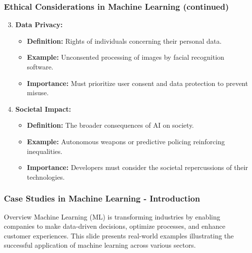 \documentclass[aspectratio=169]{beamer}
\begin{document}
\begin{frame}[fragile]
    \frametitle{Ethical Considerations in Machine Learning (continued)}
    \begin{enumerate}
        \setcounter{enumi}{2} %
        \item \textbf{Data Privacy:}
        \begin{itemize}
            \item \textbf{Definition:} Rights of individuals concerning their personal data.
            \item \textbf{Example:} Unconsented processing of images by facial recognition software.
            \item \textbf{Importance:} Must prioritize user consent and data protection to prevent misuse.
        \end{itemize}
        
        \item \textbf{Societal Impact:}
        \begin{itemize}
            \item \textbf{Definition:} The broader consequences of AI on society.
            \item \textbf{Example:} Autonomous weapons or predictive policing reinforcing inequalities.
            \item \textbf{Importance:} Developers must consider the societal repercussions of their technologies.
        \end{itemize}
    \end{enumerate}
\end{frame}

\begin{frame}[fragile]
    \frametitle{Case Studies in Machine Learning - Introduction}
    \begin{block}{Overview}
        Machine Learning (ML) is transforming industries by enabling companies to make data-driven decisions, optimize processes, and enhance customer experiences.
        This slide presents real-world examples illustrating the successful application of machine learning across various sectors.
    \end{block}
\end{frame}
\end{document}
